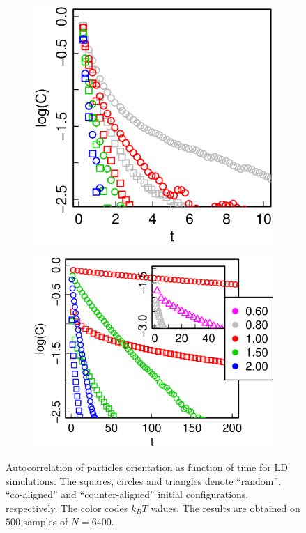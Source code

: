 \begin{figure}[t]
	\begin{subfigure}[t]{0.42\columnwidth}
		\centering
		\includegraphics[width=\textwidth]{Images/Autocors_25}
	\end{subfigure}
	\begin{subfigure}[t]{0.49\columnwidth}
		\centering
		\includegraphics[width=\textwidth]{Images/Autocors_75}
	\end{subfigure}
	\captionsetup{justification=centering, width=0.9\columnwidth}
	\caption{Autocorrelation of particles orientation as function of time for LD simulations. The squares, circles and triangles denote ``random'', ``co-aligned'' and ``counter-aligned'' initial configurations, respectively. The color codes $k_BT$ values. The results are obtained on $500$ samples of $N = 6400$.}
	\label{fig:autocorrelation}
\end{figure}


